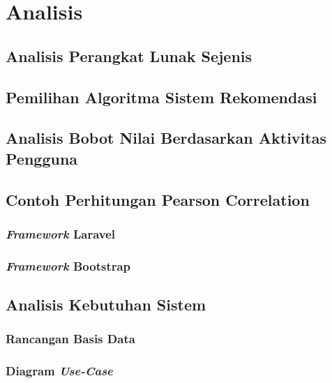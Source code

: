 \chapter{Analisis}
\label{chap:analisis}

\section{Analisis Perangkat Lunak Sejenis}
\label{sec:analisis pl}

\section{Pemilihan Algoritma Sistem Rekomendasi}

\section{Analisis Bobot Nilai Berdasarkan Aktivitas Pengguna}

\section{Contoh Perhitungan Pearson Correlation}

\subsection{\textit{Framework} Laravel}

\subsection{\textit{Framework} Bootstrap}

\section{Analisis Kebutuhan Sistem}

\subsection{Rancangan Basis Data}

\subsection{Diagram \textit{Use-Case}}

